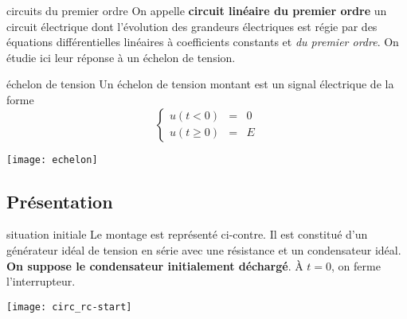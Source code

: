 \documentclass[../main/main.tex]{subfiles}
\begin{document}
\begin{tcbraster}[raster columns=2, raster equal height=rows]
    \begin{defi}[label=def:circordre1]{circuits du premier ordre}
        On appelle \textbf{circuit linéaire du premier ordre} un circuit électrique
        dont l'évolution des grandeurs électriques est régie par des équations
        différentielles linéaires à coefficients constants et \textit{du premier
        ordre}. On étudie ici leur réponse à un échelon de tension.
    \end{defi}
    \begin{defi}[label=def:echelon, sidebyside]{échelon de tension}
        Un échelon de tension montant est un signal électrique de la forme
        \[ \left\{
                \begin{array}{rcl}
                    u(t<0)    & = & 0 \\
                    u(t\geq0) & = & E
                \end{array}
        \right.\]
        \tcblower
        \begin{center}
            \texttt{[image: echelon]}
        \end{center}
    \end{defi}
\end{tcbraster}

\subsection{Présentation}
\begin{defi}[label=def:echelonC, sidebyside]{situation initiale}
    Le montage est représenté ci-contre. Il est constitué d'un générateur idéal
    de tension en série avec une résistance et un condensateur idéal. \textbf{On
    suppose le condensateur initialement déchargé}. À $t=0$, on ferme
    l'interrupteur.
    \tcblower
    \begin{center}
        \texttt{[image: circ\_rc-start]}
    \end{center}
\end{defi}
\end{document}

